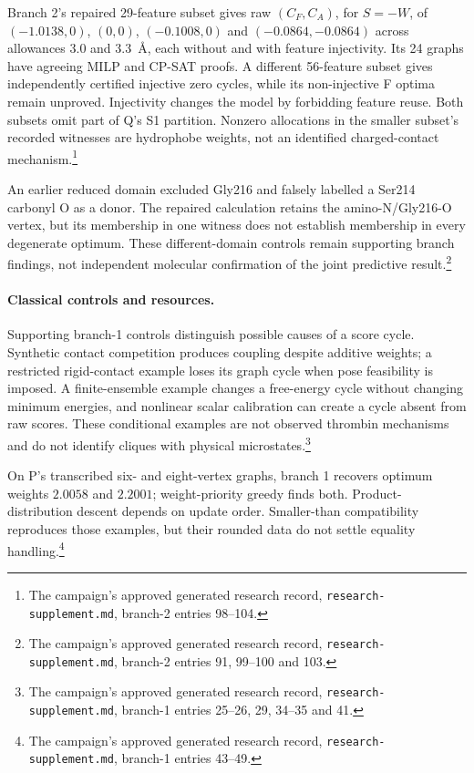 \documentclass{article}
\newcommand{\rr}[1]{\footnote{The campaign's approved generated research record, \texttt{research-supplement.md}, #1.}}
\begin{document}
Branch 2's repaired 29-feature subset gives raw \((C_F,C_A)\), for \(S=-W\), of \((-1.0138,0)\), \((0,0)\), \((-0.1008,0)\) and \((-0.0864,-0.0864)\) across allowances 3.0 and 3.3~\AA, each without and with feature injectivity. Its 24 graphs have agreeing MILP and CP-SAT proofs. A different 56-feature subset gives independently certified injective zero cycles, while its non-injective F optima remain unproved. Injectivity changes the model by forbidding feature reuse. Both subsets omit part of Q's S1 partition. Nonzero allocations in the smaller subset's recorded witnesses are hydrophobe weights, not an identified charged-contact mechanism.\rr{branch-2 entries 98--104}

An earlier reduced domain excluded Gly216 and falsely labelled a Ser214 carbonyl O as a donor. The repaired calculation retains the amino-N/Gly216-O vertex, but its membership in one witness does not establish membership in every degenerate optimum. These different-domain controls remain supporting branch findings, not independent molecular confirmation of the joint predictive result.\rr{branch-2 entries 91, 99--100 and 103}

\paragraph{Classical controls and resources.}
Supporting branch-1 controls distinguish possible causes of a score cycle. Synthetic contact competition produces coupling despite additive weights; a restricted rigid-contact example loses its graph cycle when pose feasibility is imposed. A finite-ensemble example changes a free-energy cycle without changing minimum energies, and nonlinear scalar calibration can create a cycle absent from raw scores. These conditional examples are not observed thrombin mechanisms and do not identify cliques with physical microstates.\rr{branch-1 entries 25--26, 29, 34--35 and 41}

On P's transcribed six- and eight-vertex graphs, branch 1 recovers optimum weights \(2.0058\) and \(2.2001\); weight-priority greedy finds both. Product-distribution descent depends on update order. Smaller-than compatibility reproduces those examples, but their rounded data do not settle equality handling.\rr{branch-1 entries 43--49}
\end{document}
